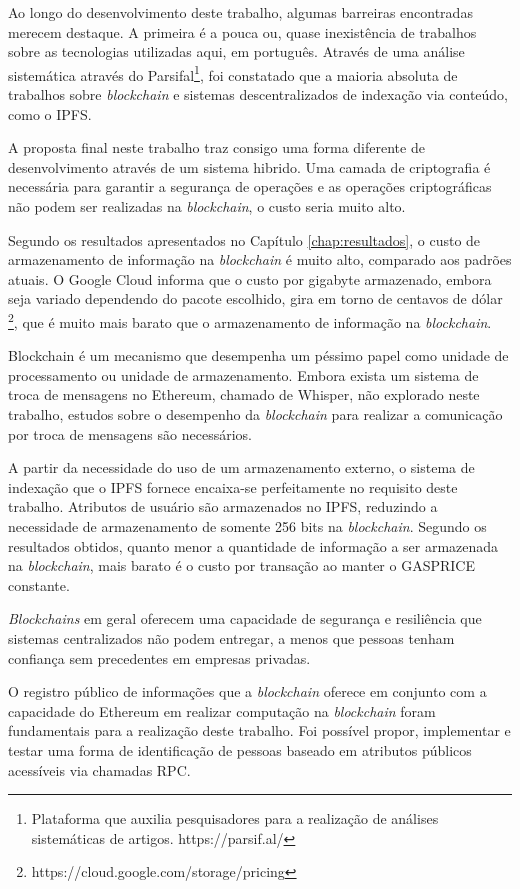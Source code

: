 \documentclass[tcc,capa]{texufpel}
\begin{document}
    Ao longo do desenvolvimento deste trabalho, algumas barreiras encontradas merecem destaque. A primeira é a pouca ou, quase inexistência de trabalhos sobre as tecnologias utilizadas aqui, em português. Através de uma análise sistemática através do Parsifal\footnote{Plataforma que auxilia pesquisadores para a realização de análises sistemáticas de artigos. https://parsif.al/}, foi constatado que a maioria absoluta de trabalhos sobre \textit{blockchain} e sistemas descentralizados de indexação via conteúdo, como o IPFS.
    
    A proposta final neste trabalho traz consigo uma forma diferente de desenvolvimento através de um sistema hibrido. Uma camada de criptografia é necessária para garantir a segurança de operações e as operações criptográficas não podem ser realizadas na \textit{blockchain}, o custo seria muito alto.

    Segundo os resultados apresentados no Capítulo \ref{chap:resultados}, o custo de armazenamento de informação na \textit{blockchain} é muito alto, comparado aos padrões atuais. O Google Cloud informa que o custo por gigabyte armazenado, embora seja variado dependendo do pacote escolhido, gira em torno de centavos de dólar \footnote{https://cloud.google.com/storage/pricing}, que é muito mais barato que o armazenamento de informação na \textit{blockchain}.

    Blockchain é um mecanismo que desempenha um péssimo papel como unidade de processamento ou unidade de armazenamento. Embora exista um sistema de troca de mensagens no Ethereum, chamado de Whisper, não explorado neste trabalho, estudos sobre o desempenho da \textit{blockchain} para realizar a comunicação por troca de mensagens são necessários.

    A partir da necessidade do uso de um armazenamento externo, o sistema de indexação que o IPFS fornece encaixa-se perfeitamente no requisito deste trabalho. Atributos de usuário são armazenados no IPFS, reduzindo a necessidade de armazenamento de somente 256 bits na \textit{blockchain}. Segundo os resultados obtidos, quanto menor a quantidade de informação a ser armazenada na \textit{blockchain}, mais barato é o custo por transação ao manter o GASPRICE constante.

    \textit{Blockchains} em geral oferecem uma capacidade de segurança e resiliência que sistemas centralizados não podem entregar, a menos que pessoas tenham confiança sem precedentes em empresas privadas.

    O registro público de informações que a \textit{blockchain} oferece em conjunto com a capacidade do Ethereum em realizar computação na \textit{blockchain} foram fundamentais para a realização deste trabalho. Foi possível propor, implementar e testar uma forma de identificação de pessoas baseado em atributos públicos acessíveis via chamadas RPC.
        
\end{document}
